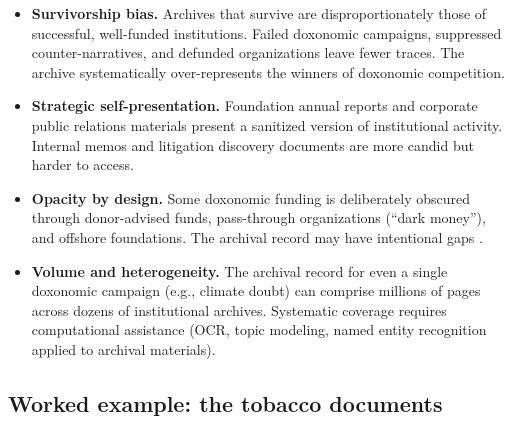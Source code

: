 \begin{itemize}
  \item \textbf{Survivorship bias.}
  Archives that survive are disproportionately those of successful, well-funded institutions.
  Failed doxonomic campaigns, suppressed counter-narratives, and defunded organizations leave fewer traces.
  The archive systematically over-represents the winners of doxonomic competition.

  \item \textbf{Strategic self-presentation.}
  Foundation annual reports and corporate public relations materials present a sanitized version of institutional activity.
  Internal memos and litigation discovery documents are more candid but harder to access.

  \item \textbf{Opacity by design.}
  Some doxonomic funding is deliberately obscured through donor-advised funds, pass-through organizations (``dark money''), and offshore foundations.
  The archival record may have intentional gaps \autocite{mayer2016}.

  \item \textbf{Volume and heterogeneity.}
  The archival record for even a single doxonomic campaign (e.g., climate doubt) can comprise millions of pages across dozens of institutional archives.
  Systematic coverage requires computational assistance (OCR, topic modeling, named entity recognition applied to archival materials).
\end{itemize}

\subsection{Worked example: the tobacco documents}

